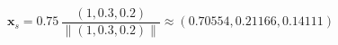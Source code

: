 $$
\mathbf x_s = 0.75\,\frac{\left(1, 0.3, 0.2\right)}{\left\lVert\left(1, 0.3, 0.2\right)\right\rVert} \approx \left(0.70554, 0.21166, 0.14111\right)
$$
